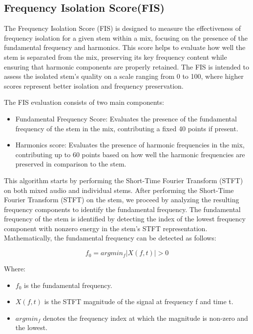 \documentclass[10pt,twocolumn]{article}
\begin{document}
\subsection{Frequency Isolation Score(FIS)}

The Frequency Isolation Score (FIS) is designed to measure the effectiveness of frequency isolation for a given stem within a mix, focusing on the presence of the fundamental frequency and harmonics. This score helps to evaluate how well the stem is separated from the mix, preserving its key frequency content while ensuring that harmonic components are properly retained. The FIS is intended to assess the isolated stem's quality on a scale ranging from 0 to 100, where higher scores represent better isolation and frequency preservation.

The FIS evaluation consists of two main components:
\begin{itemize}
    \item Fundamental Frequency Score: Evaluates the presence of the fundamental frequency of the stem in the mix, contributing a fixed 40 points if present.
    \item Harmonics score: Evaluates the presence of harmonic frequencies in the mix, contributing up to 60 points based on how well the harmonic frequencies are preserved in comparison to the stem.
\end{itemize}

This algorithm starts by performing the Short-Time Fourier Transform (STFT) on both mixed audio and individual stems. After performing the Short-Time Fourier Transform (STFT) on the stem, we proceed by analyzing the resulting frequency components to identify the fundamental frequency. The fundamental frequency of the stem is identified by detecting the index of the lowest frequency component with nonzero energy in the stem's STFT representation. Mathematically, the fundamental frequency can be detected as follows:

\[
f_0 = arg min_{f} {|X(f, t)| > 0}
\]

Where:

\begin{itemize}
    \item \(f_0 \) is the fundamental frequency.
    \item \(X(f, t) \) is the STFT magnitude of the signal at frequency f and time t.
    \item \(arg min_{f} \) denotes the frequency index at which the magnitude is non-zero and the lowest.
\end{itemize}
\end{document}

